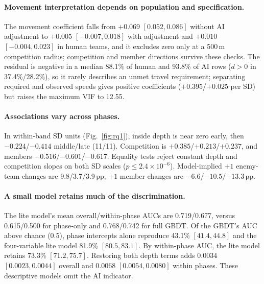 \documentclass[sigconf,anonymous,nonacm]{acmart}
\begin{document}
\paragraph{Movement interpretation depends on population and specification.}
The movement coefficient falls from $+0.069$ $[0.052,\allowbreak 0.086]$ without AI adjustment to $+0.005$ $[-0.007,\allowbreak 0.018]$ with adjustment and $+0.010$ $[-0.004,\allowbreak 0.023]$ in human teams, and it excludes zero only at a 500\,m competition radius; competition and member directions survive these checks. The residual is negative in a median 88.1\% of human and 93.8\% of AI rows ($d>0$ in 37.4\%/28.2\%), so it rarely describes an unmet travel requirement; separating required and observed speeds gives positive coefficients ($+0.395$/$+0.025$ per SD) but raises the maximum VIF to 12.55.

\paragraph{Associations vary across phases.}
In within-band SD units (Fig.~\ref{fig:rq1}), inside depth is near zero early, then $-0.224$/$-0.414$ middle/late (11/11). Competition is $+0.385$/$+0.213$/$+0.237$, and members $-0.516$/$-0.601$/$-0.617$. Equality tests reject constant depth and competition slopes on both SD scales ($p\le2.4\times10^{-6}$). Model-implied $+1$ enemy-team changes are 9.8/3.7/3.9\,pp; $+1$ member changes are $-6.6$/$-10.5$/$-13.3$\,pp.

\paragraph{A small model retains much of the discrimination.}
The lite model's mean overall/within-phase AUCs are 0.719/0.677, versus 0.615/0.500 for phase-only and 0.768/0.742 for full GBDT. Of the GBDT's AUC above chance (0.5), phase intercepts alone reproduce 43.1\% $[41.4,\allowbreak 44.8]$ and the four-variable lite model 81.9\% $[80.5,\allowbreak 83.1]$. By within-phase AUC, the lite model retains 73.3\% $[71.2,\allowbreak 75.7]$. Restoring both depth terms adds 0.0034 $[0.0023,\allowbreak 0.0044]$ overall and 0.0068 $[0.0054,\allowbreak 0.0080]$ within phases. These descriptive models omit the AI indicator.
\end{document}
